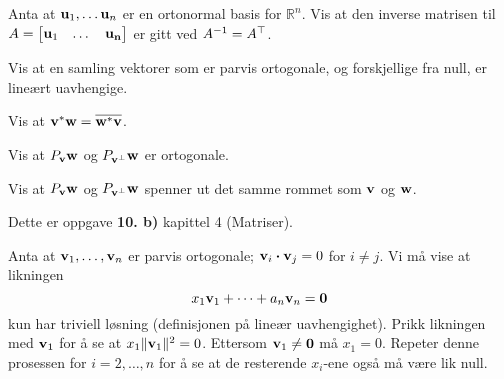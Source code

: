 \begin{oppgave}
Anta at $\mathbf{u}_1,\dots \mathbf{u}_n$ er en ortonormal basis for $\mathbb{R}^n$. Vis at den inverse matrisen til $A=\begin{bmatrix}
\mathbf{u}_1 & \dots & \mathbf{u_n}
\end{bmatrix}$ er gitt ved $A^{-1}=A^\top$.
\end{oppgave}

\begin{oppgave}
Vis at en samling vektorer som er parvis ortogonale, og forskjellige fra null, er lineært uavhengige.
\end{oppgave}


\begin{oppgave}
Vis at $\mathbf{v}^* \mathbf{w}=\overline{\mathbf{w}^* \mathbf{v}}$.
\end{oppgave}

\begin{oppgave}
Vis at $P_{\mathbf{v}}\mathbf{w}$ og $P_{\mathbf{v}^{\perp}}\mathbf{w}$ er ortogonale.
\end{oppgave}

\begin{oppgave}
Vis at $P_{\mathbf{v}}\mathbf{w}$ og $P_{\mathbf{v}^{\perp}}\mathbf{w}$ spenner ut det samme rommet som $\mathbf{v}$ og $\mathbf{w}$.
\end{oppgave}




\begin{losning}
\begin{punkt}
Dette er oppgave \textbf{10. b)} kapittel 4 (Matriser).
\end{punkt}
\begin{punkt}
Anta at $\mathbf{v}_1,\dots,\mathbf{v}_n$ er parvis ortogonale; $\mathbf{v}_i\boldsymbol{\cdot}\mathbf{v}_j=0$ for $i\neq j$. Vi må vise at likningen $$x_1\mathbf{v}_1+\dots+a_n\mathbf{v}_n=\mathbf{0}$$ kun har triviell løsning (definisjonen på lineær uavhengighet). Prikk likningen med $\mathbf{v}_1$ for å se at $x_1\|\mathbf{v}_1\|^2=0$. Ettersom $\mathbf{v}_1\neq \mathbf{0}$ må $x_1=0$. Repeter denne prosessen for $i=2,\dots,n$ for å se at de resterende $x_i$-ene også må være lik null.
\end{punkt}
\end{losning}

